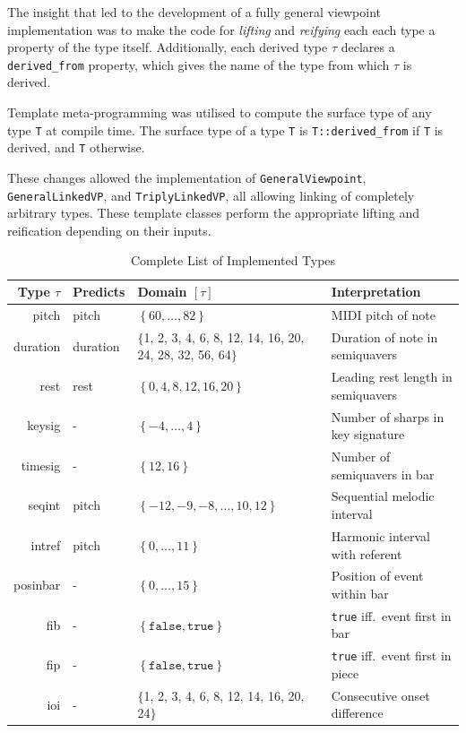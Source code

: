 \documentclass[12pt,a4paper,twoside,openright]{report}
\newcommand{\set}[1]{ \left\{ #1 \right\} }
\begin{document}
The insight that led to the development of a fully general viewpoint
implementation was to make the code for \emph{lifting} and \emph{reifying} each
each type a property of the type itself. Additionally, each derived type $\tau$
declares a \texttt{derived\_from} property, which gives the name of the type
from which $\tau$ is derived. 

Template meta-programming was utilised to compute the surface type of any type
\texttt{T} at compile time. The surface type of a type \texttt{T} is
\texttt{T::derived\_from} if \texttt{T} is derived, and \texttt{T} otherwise.

These changes allowed the implementation of \texttt{GeneralViewpoint},
\texttt{GeneralLinkedVP}, and \texttt{TriplyLinkedVP}, all allowing linking of
completely arbitrary types. These template classes perform the appropriate
lifting and reification depending on their inputs.

\begin{table}[H]
  \begin{tabular}{ r | l | p{4.55cm} | p{6.5cm} }
    Type $\tau$ & Predicts & Domain $[\tau]$ & Interpretation \\ \hline
    pitch & pitch & $\set{60,\ldots,82}$ & MIDI pitch of note \\
    duration & duration & $\{$1, 2, 3, 4, 6, 8, 12, 14, 16, 20, 24, 28, 32, 56,
    64$\}$ &
    Duration of note in semiquavers \\
    rest & rest & $\set{0,4,8,12,16,20}$ & Leading rest length in semiquavers \\
    keysig & - & $\set{-4,\ldots,4}$ & Number of sharps in key signature \\
    timesig & - & $\set{12,16}$ & Number of semiquavers in bar \\ \hline
    seqint & pitch & $\set{-12,-9,-8,\ldots,10,12}$ & Sequential melodic interval \\
    intref & pitch & $\set{0,\ldots,11}$ & Harmonic interval with referent \\
    posinbar & - & $\set{0,\ldots,15}$ & Position of event within bar \\
    fib & - & $\set{\texttt{false}, \texttt{true}}$ & \texttt{true} iff.\ event first in bar \\
    fip & - & $\set{\texttt{false}, \texttt{true}}$ & \texttt{true} iff.\ event first in piece \\
    ioi & - & $\{$1, 2, 3, 4, 6, 8, 12, 14, 16, 20, 24$\}$ & Consecutive onset
    difference
  \end{tabular}
  \caption{Complete List of Implemented Types}
  \label{tab:mvs-types}
\end{table}
\end{document}
